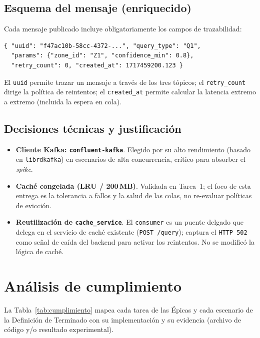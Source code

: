\documentclass[11pt,a4paper]{article}
\begin{document}
\subsection{Esquema del mensaje (enriquecido)}
Cada mensaje publicado incluye obligatoriamente los campos de trazabilidad:
\begin{lstlisting}
{ "uuid": "f47ac10b-58cc-4372-...", "query_type": "Q1",
  "params": {"zone_id": "Z1", "confidence_min": 0.8},
  "retry_count": 0, "created_at": 1717459200.123 }
\end{lstlisting}
El \texttt{uuid} permite trazar un mensaje a través de los tres tópicos; el
\texttt{retry\_count} dirige la política de reintentos; el \texttt{created\_at}
permite calcular la latencia extremo a extremo (incluida la espera en cola).

\subsection{Decisiones técnicas y justificación}
\begin{itemize}[noitemsep]
  \item \textbf{Cliente Kafka: \texttt{confluent-kafka}}. Elegido por su alto
        rendimiento (basado en \texttt{librdkafka}) en escenarios de alta
        concurrencia, crítico para absorber el \emph{spike}.
  \item \textbf{Caché congelada (LRU / 200\,MB)}. Validada en Tarea~1; el foco
        de esta entrega es la tolerancia a fallos y la salud de las colas, no
        re-evaluar políticas de evicción.
  \item \textbf{Reutilización de \texttt{cache\_service}}. El \texttt{consumer}
        es un puente delgado que delega en el servicio de caché existente
        (\texttt{POST /query}); captura el \texttt{HTTP 502} como señal de caída
        del backend para activar los reintentos. No se modificó la lógica de
        caché.
\end{itemize}

\section{Análisis de cumplimiento}
La Tabla~\ref{tab:cumplimiento} mapea cada tarea de las Épicas y cada escenario
de la Definición de Terminado con su implementación y su evidencia
(archivo de código y/o resultado experimental).
\end{document}
